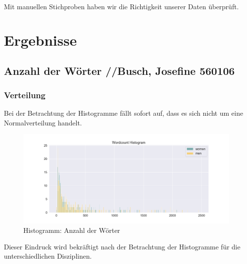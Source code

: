 \documentclass[11pt]{article}
\begin{document}
Mit manuellen Stichproben haben wir die Richtigkeit unserer Daten überprüft.

\section {Ergebnisse}
\subsection{Anzahl der Wörter //Busch, Josefine 560106}
\subsubsection{Verteilung}
Bei der Betrachtung der Histogramme fällt sofort auf, dass es sich nicht um eine Normalverteilung handelt.

\begin{figure}
\caption{Histogramm: Anzahl der Wörter}
\includegraphics[width=1\textwidth]{figures/wordcount_small_bins_histogram.png}
\end{figure}

Dieser Eindruck wird bekräftigt nach der Betrachtung der Histogramme für die unterschiedlichen Disziplinen.
\end{document}
